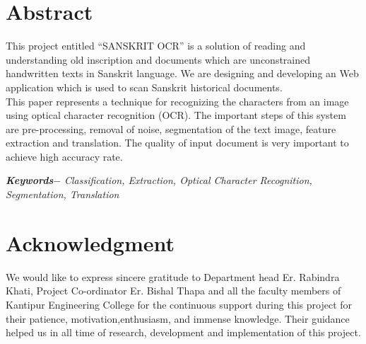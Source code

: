 







\chapter*{Abstract} %
This project entitled “SANSKRIT OCR” is a solution of reading and understanding old inscription and documents which are unconstrained handwritten texts in Sanskrit language. We are designing and developing an Web application which is used to scan Sanskrit historical documents.\\
This paper represents a technique for recognizing the characters from an image using optical character recognition (OCR). The important steps of this system are pre-processing, removal of noise, segmentation of the text image, feature extraction and translation. The quality of input document is very important to achieve high accuracy rate.
\par
\textbf{\textit{Keywords$-$}} \emph{Classification, Extraction, Optical Character Recognition, Segmentation, Translation}

\chapter*{Acknowledgment}
We would like to express sincere gratitude to Department head Er. Rabindra Khati, Project Co-ordinator Er. Bishal Thapa and all the faculty members of Kantipur Engineering College for the continuous support during this project for their patience, motivation,enthusiasm, and immense knowledge. Their guidance helped us in all time of research, development and implementation of this project.   \par
\begin{flushright}
\vskip -20pt
\submittedBy

\end{flushright}

